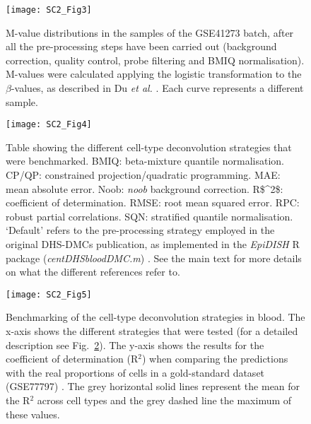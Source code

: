 \begin{figure}[htbp!] 
	\centering    
	\texttt{[image: SC2\_Fig3]}
	\caption[M-value distributions in the GSE41273 batch]{M-value distributions in the samples of the GSE41273 batch, after all the pre-processing steps have been carried out (background correction, quality control, probe filtering and BMIQ normalisation). M-values were calculated applying the logistic transformation to the $\beta$-values, as described in Du \textit{et al.} \cite{Du2010}. Each curve represents a different sample.}
	\label{fig:sc2_fig3}
\end{figure}

\begin{figure}[htbp!] 
	\centering    
	\texttt{[image: SC2\_Fig4]}
	\caption[Cell-type deconvolution strategies that were benchmarked]{Table showing the different cell-type deconvolution strategies that were benchmarked. BMIQ: beta-mixture quantile normalisation. \acrshort{CP/QP}: constrained projection/quadratic programming. \acrshort{MAE}: mean absolute error. Noob: \textit{noob} background correction.  \acrshort{R$^2$}: coefficient of determination. \acrshort{RMSE}: root mean squared error. \acrshort{RPC}: robust partial correlations. \acrshort{SQN}: stratified quantile normalisation. `Default' refers to the pre-processing strategy employed in the original DHS-DMCs publication, as implemented in the \textit{EpiDISH} R package (\textit{centDHSbloodDMC.m}) \cite{Teschendorff2017a,Teschendorff2017b}. See the main text for more details on what the different references refer to.}
	\label{fig:sc2_fig4}
\end{figure}

\begin{figure}[htbp!] 
	\centering    
	\texttt{[image: SC2\_Fig5]}
	\caption[Benchmarking of the cell-type deconvolution strategies in blood: R$^2$]{Benchmarking of the cell-type deconvolution strategies in blood. The x-axis shows the different strategies that were tested (for a detailed description see Fig.~\ref{fig:sc2_fig4}). The y-axis shows the results for the coefficient of determination (R$^2$) when comparing the predictions with the real proportions of cells in a gold-standard dataset (GSE77797) \cite{Koestler2016}. The grey horizontal solid lines represent the mean for the R$^2$ across cell types and the grey dashed line the maximum of these values.}
	\label{fig:sc2_fig5}
\end{figure}

